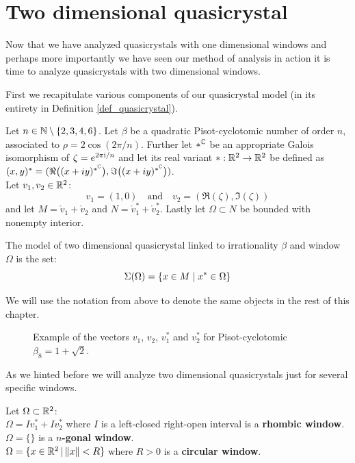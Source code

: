 \documentclass[text.tex]{subfiles}
\begin{document}
\section{Two dimensional quasicrystal}
Now that we have analyzed quasicrystals with one dimensional windows and perhaps more importantly we have seen our method of analysis in action it is time to analyze quasicrystals with two dimensional windows. 

First we recapitulate various components of our quasicrystal model (in its entirety in Definition \ref{def_quasicrystal}). 

Let $n\in\mathbb{N}\setminus\{2,3,4,6\}$. Let $\beta$ be a quadratic Pisot-cyclotomic number of order $n$, associated to $\rho = 2\cos\left(2\pi/n\right)$. Further let $\ast^{\mathbb{C}}$ be an appropriate Galois isomorphism of $\zeta = e^{2\pi \mathrm{i}/n}$ and let its real variant $\ast:\mathbb{R}^2\to\mathbb{R}^2$ be defined as $(x,y)^\ast = (\Re{\big((x+iy)^{\ast^{\mathbb{C}}}\big)}, \Im{\big((x+iy)^{\ast^{\mathbb{C}}}\big)})$. \\
Let $v_1, v_2\in\mathbb{R}^2$:
$$v_1=(1,0)\quad\text{and}\quad v_2 = (\Re{(\zeta)}, \Im{(\zeta)})$$
and let $M = \ring v_1+\ring v_2$ and $N = \ring v_1^\ast+\ring v_2^\ast$.
Lastly let $\Omega\subset N$ be bounded with nonempty interior. 

The model of two dimensional quasicrystal linked to irrationality $\beta$ and window $\Omega$ is the set:
$$\Sigma(\Omega) = \{ x \in M\; |\; x^\ast\in \Omega\}$$

We will use the notation from above to denote the same objects in the rest of this chapter. 

\begin{figure}[h!]
\centering
{}
\caption{Example of the vectors $v_1$, $v_2$, $v_1^\ast$ and $v_2^\ast$ for Pisot-cyclotomic $\beta_8=1+\sqrt{2}$.}
\end{figure}

As we hinted before we will analyze two dimensional quasicrystals just for several specific windows. 
\begin{definition}
Let $\Omega\subset\mathbb{R}^2$:\\
$\Omega = Iv_1^\ast+Iv_2^\ast$ where $I$ is a left-closed right-open interval is a \textbf{rhombic window}. \\
$\Omega = \{\}$ is a \textbf{$n$-gonal window}. \\ 
$\Omega = \{x\in\mathbb{R}^2\,|\,\lVert x \rVert < R\}$ where $R>0$ is a \textbf{circular window}.
\end{definition}
\end{document}
